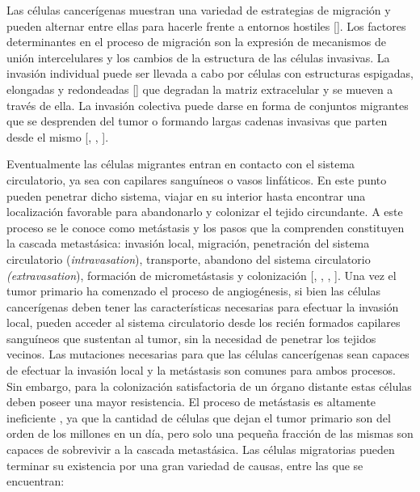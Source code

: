 \hspace{.1cm}Las células cancerígenas muestran una variedad de estrategias de migración y pueden alternar entre ellas para hacerle frente a entornos hostiles [\cite{migration}]. Los factores determinantes en el proceso de migración son la expresión de mecanismos de unión intercelulares y los cambios de la estructura de las células invasivas. La invasión individual puede ser llevada a cabo por células con estructuras espigadas, elongadas y redondeadas [\cite{migration}] que degradan la matriz extracelular y se mueven a través de ella. La invasión colectiva puede darse en forma de conjuntos migrantes que se desprenden del tumor o formando largas cadenas invasivas que parten desde el mismo [\cite{robins}, \cite{hanahan}, \cite{cancerbook}].

\hspace{.1cm}Eventualmente las células migrantes entran en contacto con el sistema circulatorio, ya sea con capilares sanguíneos o vasos linfáticos. En este punto pueden penetrar dicho sistema, viajar en su interior hasta encontrar una localización favorable para abandonarlo y colonizar el tejido circundante. A este proceso se le conoce como metástasis y los pasos que la comprenden constituyen la cascada metastásica: invasión local, migración, penetración del sistema circulatorio (\textit{intravasation}), transporte, abandono del sistema circulatorio \textit{(extravasation}), formación de micrometástasis y colonización [\cite{robins}, \cite{invasion}, \cite{hanahan}, \cite{cancerbook}]. Una vez el tumor primario ha comenzado el proceso de angiogénesis, si bien las células cancerígenas deben tener las características necesarias para efectuar la invasión local, pueden acceder al sistema circulatorio desde los recién formados capilares sanguíneos que sustentan al tumor, sin la necesidad de penetrar los tejidos vecinos.
\hspace{.1cm}Las mutaciones necesarias para que las células cancerígenas sean capaces de efectuar la invasión local y la metástasis son comunes para ambos procesos. Sin embargo, para la colonización satisfactoria de un órgano distante estas células deben poseer una mayor resistencia. El proceso de metástasis es altamente ineficiente \cite{pubmed}, ya que la cantidad de células que dejan el tumor primario son del orden de los millones en un día, pero solo una pequeña fracción de las mismas son capaces de sobrevivir a la cascada metastásica. Las células migratorias pueden terminar su existencia por una gran variedad de causas, entre las que se encuentran:
